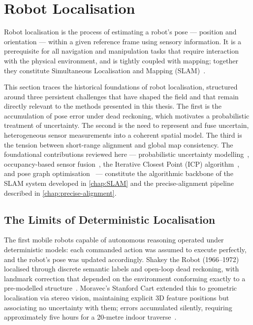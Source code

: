 \section{Robot Localisation}
\label{sec:robot-localisation}

Robot localisation is the process of estimating a robot's pose --- position and orientation --- within a given reference frame using sensory information. It is a prerequisite for all navigation and manipulation tasks that require interaction with the physical environment, and is tightly coupled with mapping; together they constitute Simultaneous Localisation and Mapping (SLAM)~\cite{ullahMobileRobotLocalization2024,leonardSimultaneousMapBuilding1991}.

This section traces the historical foundations of robot localisation, structured around three persistent challenges that have shaped the field and that remain directly relevant to the methods presented in this thesis. The first is the accumulation of pose error under dead reckoning, which motivates a probabilistic treatment of uncertainty. The second is the need to represent and fuse uncertain, heterogeneous sensor measurements into a coherent spatial model. The third is the tension between short-range alignment and global map consistency. The foundational contributions reviewed here --- probabilistic uncertainty modelling~\cite{smithRepresentationEstimationSpatial1987}, occupancy-based sensor fusion~\cite{elfesUsingOccupancyGrids1989}, the Iterative Closest Point (ICP) algorithm~\cite{beslMethodRegistration3D1992a}, and pose graph optimisation~\cite{luGloballyConsistentRange1997} --- constitute the algorithmic backbone of the SLAM system developed in \cref{chap:SLAM} and the precise-alignment pipeline described in \cref{chap:precise-alignment}.

\subsection{The Limits of Deterministic Localisation}
\label{subsec:deterministic-localisation}

The first mobile robots capable of autonomous reasoning operated under deterministic models: each commanded action was assumed to execute perfectly, and the robot's pose was updated accordingly. Shakey the Robot (1966--1972) localised through discrete semantic labels and open-loop dead reckoning, with landmark correction that depended on the environment conforming exactly to a pre-modelled structure~\cite{nilssonShakeyRobot1984}. Moravec's Stanford Cart extended this to geometric localisation via stereo vision, maintaining explicit 3D feature positions but associating no uncertainty with them; errors accumulated silently, requiring approximately five hours for a 20-metre indoor traverse~\cite{moravecObstacleAvoidanceNavigatio1980,moravecStanfordCartCMU1990}.

